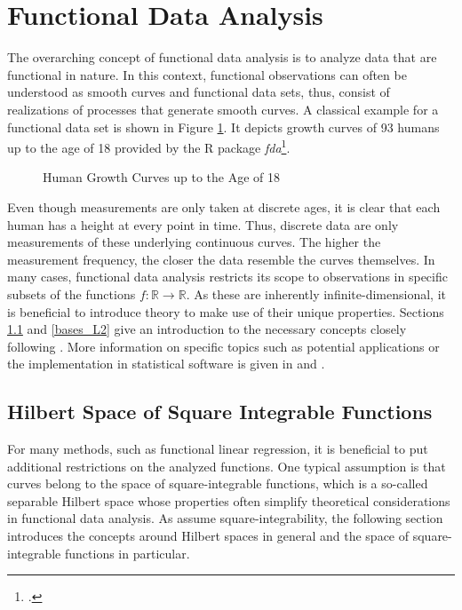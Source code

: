 \documentclass[12pt, a4paper]{article}
\theoremstyle{MAstyle} \newtheorem{assumption}{Assumption}[section]
\theoremstyle{MAstyle} \newtheorem{definition}{Definition}[section]
\theoremstyle{MAstyle} \newtheorem{theorem}{Theorem}[section]
\begin{document}
	\section{Functional Data Analysis}\label{FDA}
		The overarching concept of functional data analysis is to analyze data that are functional in nature. In this context, functional observations can often be understood as smooth curves and functional data sets, thus, consist of realizations of processes that generate smooth curves. A classical example for a functional data set is shown in Figure \ref{growth_curves}. It depicts growth curves of 93 humans up to the age of 18 provided by the R package \textit{fda}\footcite{fda}.
		\begin{figure}[H]
			\caption{Human Growth Curves up to the Age of 18}
			\label{growth_curves}
		\end{figure}
		Even though measurements are only taken at discrete ages, it is clear that each human has a height at every point in time. Thus, discrete data are only measurements of these underlying continuous curves. The higher the measurement frequency, the closer the data resemble the curves themselves.
		In many cases, functional data analysis restricts its scope to observations in specific subsets of the functions $f:\mathbb{R} \rightarrow \mathbb{R}$.
		As these are inherently infinite-dimensional, it is beneficial to introduce theory to make use of their unique properties. Sections \ref{Square_Integrable_Functions} and \ref{bases_L2} give an introduction to the necessary concepts closely following \cite{hsing_theoretical_2015}. More information on specific topics such as potential applications or the implementation in statistical software is given in \cite{ramsay_functional_2005} and \cite{kokoszka_introduction_2021}.
	
		\subsection{Hilbert Space of Square Integrable Functions}\label{Square_Integrable_Functions}
			For many methods, such as functional linear regression, it is beneficial to put additional restrictions on the analyzed functions. One typical assumption is that curves belong to the space of square-integrable functions, which is a so-called separable Hilbert space whose properties often simplify theoretical considerations in functional data analysis. 
			As \cite{bugni_permutation_2021} assume square-integrability, the following section introduces the concepts around Hilbert spaces in general and the space of square-integrable functions in particular.\\
			
\end{document}
